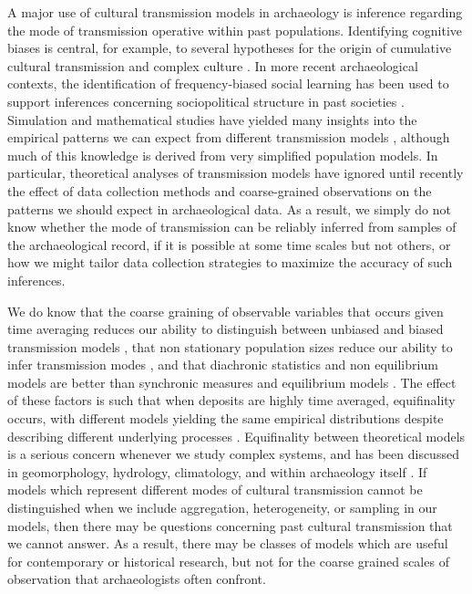 \documentclass[10pt,letterpaper]{article}
\begin{document}
A major use of cultural transmission models in archaeology is inference
regarding the mode of transmission operative within past populations.
Identifying cognitive biases is central, for example, to several
hypotheses for the origin of cumulative cultural transmission and
complex culture \cite{BR1985, CF1981, Henrich:1998ek, Wakano:2007gq}.
In more recent archaeological contexts, the identification of
frequency-biased social learning has been used to support
inferences concerning sociopolitical structure 
in past societies \cite{kohler2004}.  Simulation and mathematical
studies have yielded many insights into the empirical patterns we can expect from different transmission models
\cite{Bentley2003, bentley2007regular, bentley2004random, Evans:2011vm, Mesoudi2009},
although much of this knowledge is derived from very simplified
population models.  In particular, theoretical analyses of transmission models  have ignored until recently the effect of data collection methods and coarse-grained observations on the patterns we should expect in archaeological data.  As a result, we simply do not know whether the mode of transmission can be reliably inferred from samples of the archaeological record, if it is possible at some time scales but not others, or how we might tailor data collection strategies to maximize the accuracy of such inferences.


We do know that the coarse graining of observable variables that occurs given time averaging reduces our ability to distinguish between
unbiased and biased transmission models
\cite{Madsen2012TA, Porcic2014Exploring-the-E, Premo:2014jv}, that non stationary
population sizes reduce our ability to infer transmission modes \cite{Rorabaugh:2014fl}, and that
diachronic statistics and non equilibrium models are better than
synchronic measures and equilibrium models 
\cite{kandler2013non, wilderkandler2015}.  The effect of these factors is such that when deposits are highly time averaged, equifinality occurs, with different models yielding the same empirical distributions despite describing different underlying processes \cite{von1949problems}. Equifinality between
theoretical models is a serious concern whenever we study complex
systems, and has been discussed in geomorphology, hydrology,
climatology, and within archaeology itself
\cite{Aronica:1998dm, Beven:2006js, Bonham:2009bi, Cicchetti:1996gp, 
Culling:1987kx, Marean:1992hg, Rogers:2000bq, Savenije:2001fe}.
If models which represent different modes of cultural transmission
cannot be distinguished when we include aggregation, heterogeneity, or sampling in our models,
then there may be questions concerning past cultural transmission that
we cannot answer.  As a result, there may be classes of models which are useful for contemporary or historical 
research, but not for the coarse grained scales of observation that archaeologists often confront.
\end{document}
